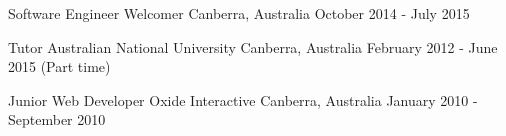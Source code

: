 \begin{cventries}

\cventry
{Software Engineer} %
{Welcomer} %
{Canberra, Australia} %
{October 2014 - July 2015} %
{ %
\begin{cvitems}
\end{cvitems}
}

\vspace{-4.0mm}


\cventry
{Tutor} %
{Australian National University} %
{Canberra, Australia} %
{February 2012 - June 2015 (Part time)} %
{ %
\begin{cvitems}
\end{cvitems}
}

\vspace{-4.0mm}


\cventry
{Junior Web Developer} %
{Oxide Interactive} %
{Canberra, Australia} %
{January 2010 - September 2010} %
{ %
\begin{cvitems}
\end{cvitems}
}


\end{cventries}
